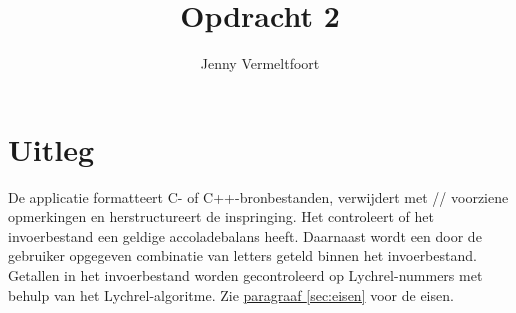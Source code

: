 \documentclass[10pt]{article}
\title{Opdracht 2}
\author{Jenny Vermeltfoort}
\begin{document}
\def\tablename{Tabel}

\maketitle

\section{Uitleg}
De applicatie formatteert C- of C++-bronbestanden, verwijdert met // voorziene opmerkingen en herstructureert de
inspringing. Het controleert of het invoerbestand een geldige accoladebalans heeft. Daarnaast wordt een door de
gebruiker opgegeven combinatie van letters geteld binnen het invoerbestand. Getallen in het invoerbestand worden
gecontroleerd op Lychrel-nummers met behulp van het Lychrel-algoritme. Zie \hyperref[sec:eisen]{paragraaf
      \ref{sec:eisen}} voor de eisen.
\end{document}
